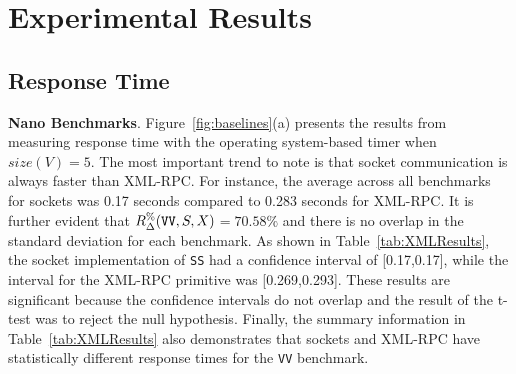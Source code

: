 \documentclass{sig-alternate}
\begin{document}
\vspace*{-.1in}
\section{Experimental Results}
\label{sec:results}

\subsection{Response Time}
\label{sec:time-overhead}




{\bf Nano Benchmarks}. Figure~\ref{fig:baselines}(a) presents the
results from measuring response time with the operating system-based
timer when $size(V)=5$.  The most important trend to note is that
socket communication is always faster than XML-RPC.  For instance, the
average across all benchmarks for sockets was 0.17 seconds compared to
0.283 seconds for XML-RPC.  It is further evident that {\small
  $R_\Delta^\%(\mbox{{\tt VV}},S,X)$}$ = 70.58\%$ and there is no
overlap in the standard deviation for each benchmark. As shown in
Table~\ref{tab:XMLResults}, the socket implementation of \texttt{SS}
had a confidence interval of [0.17,0.17], while the interval for the
XML-RPC primitive was [0.269,0.293].  These results are significant
because the confidence intervals do not overlap and the result of the
t-test was to reject the null hypothesis.  Finally, the summary
information in Table~\ref{tab:XMLResults} also demonstrates that
sockets and XML-RPC have statistically different response times for
the \texttt{VV} benchmark.

\end{document}
